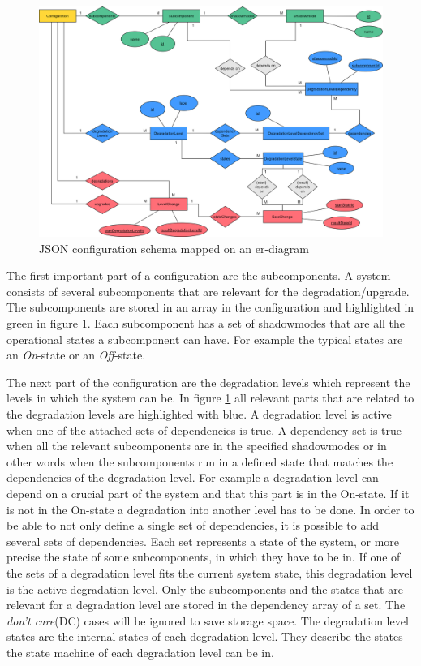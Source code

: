 \begin{figure}[ht]
    \centering
    \includegraphics[width=\textwidth]{img/configuration_diagramm.png}
    \caption{JSON configuration schema mapped on an er-diagram}
    \label{fig:configuration_diagram}
\end{figure}

\noindent The first important part of a configuration are the subcomponents. A system consists of several subcomponents that are relevant for the degradation/upgrade. The subcomponents are stored in an array in the configuration and highlighted in green in figure \ref{fig:configuration_diagram}. Each subcomponent has a set of shadowmodes that are all the operational states a subcomponent can have. For example the typical states are an \textit{On}-state or an \textit{Off}-state.

The next part of the configuration are the degradation levels which represent the levels in which the system can be. In figure \ref{fig:configuration_diagram} all relevant parts that are related to the degradation levels are highlighted with blue. A degradation level is active when one of the attached sets of dependencies is true. A dependency set is true when all the relevant subcomponents are in the specified shadowmodes or in other words when the subcomponents run in a defined state that matches the dependencies of the degradation level. For example a degradation level can depend on a crucial part of the system and that this part is in the On-state. If it is not in the On-state a degradation into another level has to be done. In order to be able to not only define a single set of dependencies, it is possible to add several sets of dependencies. Each set represents a state of the system, or more precise the state of some subcomponents, in which they have to be in. If one of the sets of a degradation level fits the current system state, this degradation level is the active degradation level. Only the subcomponents and the states that are relevant for a degradation level are stored in the dependency array of a set. The \textit{don't care}(DC) cases will be ignored to save storage space. The degradation level states are the internal states of each degradation level. They describe the states the state machine of each degradation level can be in.

